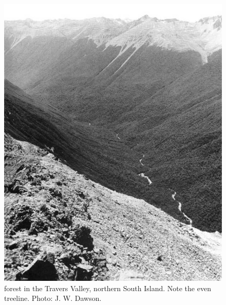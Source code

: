 \begin{figure}[t]
	\begin{minipage}[t]{\textwidth}
		\begin{minipage}[t]{(\textwidth-\fgap) * \real{0.501}}
			\centering
			\includegraphics[width=\textwidth]{graphics/fig_071}
			\caption[Nothofagus forest in the Travers Valley]{ forest in the Travers Valley, northern South Island.
			Note the even treeline.
			Photo: J. W. Dawson.}%
			\label{fig:71nothofagus-forest}
		\end{minipage}\hspace{\fgap}%
		\begin{minipage}[t]{(\textwidth-\fgap) * \real{0.499}}
			\centering

\end{minipage}
\end{minipage}
\end{figure}

